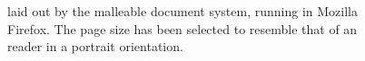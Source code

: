 \begin{figure}
\begin{center}
\end{center}
\caption[A sample of document layout]{\cite{Pinkney2011} laid out by the malleable document system, running in Mozilla Firefox. The page size has been selected to resemble that of an \ebook{} reader in a portrait orientation.}
\label{fig:example-ereader}
\end{figure}

